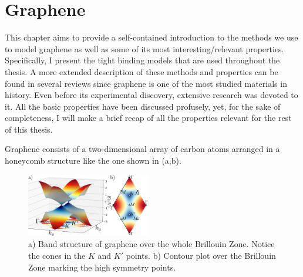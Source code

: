\chapter{Graphene}
\label{ch:graphene}

%
%

This chapter aims to provide a self-contained introduction to the methods we use to model graphene as well as some of its most interesting/relevant properties. Specifically, I present the tight binding models that are used throughout the thesis. A more extended description of these methods and properties can be found in several reviews since graphene is one of the most studied materials in history\cite{KatsnelsonBook, Geim2007, Murakami2009, CastroNeto2009a, Mas-Balleste2011, Konschuh2011a, Cooper2012, Han2014, Sadurni2014, Rozhkov2016,Novoselov2004, Novoselov2005}.
Even before its experimental discovery, extensive research was devoted to it\cite{Wallace1947, VanBommel1975, Semenoff1984, Haldane1988, Forbeaux1998, Oshima2000}.
All the basic properties have been discussed profusely, yet, for the sake of completeness, I will make a brief recap of all the properties relevant for the rest of this thesis.
\medskip


Graphene consists of a two-dimensional array of carbon atoms arranged in a honeycomb structure\cite{Huang2011} %
like the one shown in (a,b).

\begin{figure}
\centering
\vspace{-10pt}
\includegraphics[width=0.48\textwidth]{graphene/figures/bands_min.pdf}
\vspace{-7pt}
\caption{a) Band structure of graphene over the whole Brillouin Zone. Notice the cones in the $K$ and $K'$ points. b) Contour plot over the Brillouin Zone marking the high symmetry points.}
\label{G_bands_min}
\end{figure}
\FloatBarrier


